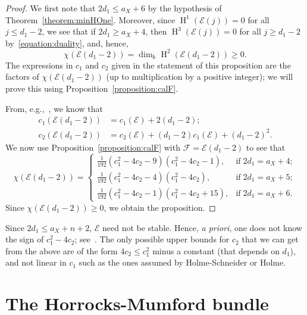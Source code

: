 \documentclass[11pt,a4paper]{amsart}
\theoremstyle{plain}
\theoremstyle{definition}
\newcommand{\calE}{\mathcal E}
\newcommand{\calF}{\mathcal F}
\DeclareMathOperator{\homology}{H}
\begin{document}
\begin{proof}
%
We first note that $2d_1 \leq a_X+6$ by the hypothesis of
Theorem~\ref{theorem:minHOne}.
Moreover, since $\homology^1(\calE(j)) = 0$ for all $j \leq d_1-2$, we see
that if $2d_1 \geq a_X+4$, then $\homology^3(\calE(j)) = 0$ for all $j \geq
d_1-2$ by~\eqref{equation:duality}, and, hence,
\[
\chi(\calE(d_1-2)) = \dim_\Bbbk \homology^2(\calE(d_1-2)) \geq 0.
\]
The expressions in $c_1$ and $c_2$ given in the statement of this
proposition are the factors of $\chi(\calE(d_1-2))$ (up to multiplication
by a positive integer); we will prove this using
Proposition~\ref{proposition:calF}.

From, e.g.,~\cite[Chapter~1, \S 1.2]{OSSvb2011}, we know that 
\begin{align*}
c_1(\calE(d_1-2)) & = c_1(\calE) + 2(d_1-2);\\
c_2(\calE(d_1-2)) & = c_2(\calE) + (d_1-2)c_1(\calE)  + (d_1-2)^2.
\end{align*}
We now use Proposition~\ref{proposition:calF} with $\calF = \calE(d_1-2)$
to see that 
\[
\chi(\calE(d_1-2)) = 
\begin{cases}
%
\frac 1{192} (c_1^2 - 4 c_2 - 9)(c_1^2 - 4 c_2 - 1), & \text{if}\; 2d_1= a_X+4;
\\
\frac 1{192}(c_1^2 - 4 c_2 - 4)(c_1^2 - 4 c_2 ), & \text{if}\; 2d_1= a_X+5;
\\
\frac 1{192}(c_1^2 - 4 c_2 - 1)(c_1^2 - 4 c_2 + 15 ) , & \text{if}\; 2d_1= a_X+6. 
\end{cases}
\]
Since 
$\chi(\calE(d_1-2))  \geq 0$, we obtain the proposition.
\end{proof}

Since $2d_1 \leq a_X+n+2$, $\calE$ need not be stable. 
Hence, \textit{a priori}, one does not know the sign of $c_1^2 - 4 c_2$; 
see~\cite[Chapter~2, \S 2.2]{OSSvb2011}.
The only possible upper bounds for $c_2$ that we can get from the above are
of the form $4c_2 \leq c_1^2$ minus a constant (that depends on $d_1$), and
not linear in $c_1$ such as the ones assumed by Holme-Schneider or Holme.

\section{The Horrocks-Mumford bundle}
\label{section:hmbundle}
\end{document}
